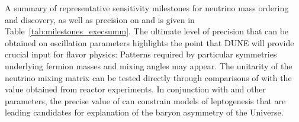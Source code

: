 A summary of representative sensitivity milestones for neutrino 
mass ordering and  discovery, as well as precision on 
\deltacp and  is given in 
Table~\ref{tab:milestones_execsumm}.  The ultimate level of 
precision that can be obtained on oscillation parameters 
highlights the point that DUNE will provide crucial input for  
flavor physics:  Patterns required by particular symmetries 
underlying fermion masses and mixing angles may appear.  The 
unitarity of the neutrino mixing matrix can be tested directly 
through comparisons of  with the value obtained from 
reactor experiments.  
In conjunction with  and 
other parameters, the precise value of \deltacp can  
constrain models of leptogenesis that are leading 
candidates for explanation of the baryon asymmetry of the Universe.

